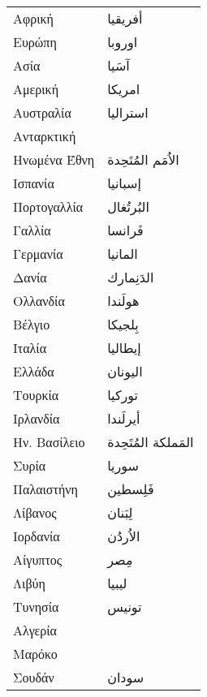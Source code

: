 \documentclass[twocolumn,a4paper]{article}
\newcommand{\ar}[1]{\textarabic{#1}}
\begin{document}
\begin{mpsupertabular}{ P{0.5\textwidth} P{0.5\textwidth} }
Αφρική       & \ar{ أفريقيا } \\
Ευρώπη       & \ar{ اوروبا } \\
Ασία         & \ar{ آسَيا } \\
Αμερική      & \ar{ امريكا } \\
Αυστραλία    & \ar{ استراليا } \\
Ανταρκτική   & \ar{  } \\

Ηνωμένα Έθνη & \ar{ اﻻُمَم المُتَحِدة } \\
Ισπανία      & \ar{ إسبانيا } \\
Πορτογαλλία  & \ar{ البُرتُغال } \\
Γαλλία       & \ar{ فَرانسا } \\
Γερμανία     & \ar{ المانيا } \\
Δανία        & \ar{  الدَنِمارك} \\
Ολλανδία     & \ar{ هولَندا } \\
Βέλγιο       & \ar{ بِلجيكا } \\

Ιταλία       & \ar{ إيطاليا } \\
Ελλάδα       & \ar{ اليونان } \\
Τουρκία      & \ar{ توركيا } \\

Ιρλανδία     & \ar{ أيرلَندا } \\
Ην. Βασίλειο & \ar{ المَملكة المُتَحِدة }\\

Συρία        & \ar{ سوريا } \\
Παλαιστήνη   & \ar{ فَلِسطين } \\
Λίβανος      & \ar{ لِبَنان } \\
Ιορδανία     & \ar{ الاُردُن } \\


Αίγυπτος     & \ar{ مِصر } \\
Λιβύη        & \ar{ ليبيا } \\
Τυνησία      & \ar{ تونيس } \\
Αλγερία      & \\  %
Μαρόκο       & \\ %
Σουδάν       & \ar{ سودان } \\



\end{mpsupertabular}
\end{document}
